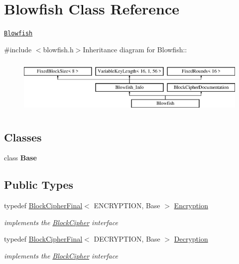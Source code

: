 \hypertarget{class_blowfish}{
\section{Blowfish Class Reference}
\label{class_blowfish}
}


\href{http://www.weidai.com/scan-mirror/cs.html#Blowfish}{\tt Blowfish}  


{\ttfamily \#include $<$blowfish.h$>$}Inheritance diagram for Blowfish::\begin{figure}[H]
\begin{center}
\leavevmode
\includegraphics[height=2.73171cm]{class_blowfish}
\end{center}
\end{figure}
\subsection*{Classes}
\begin{DoxyCompactItemize}
\item 
class {\bfseries Base}
\end{DoxyCompactItemize}
\subsection*{Public Types}
\begin{DoxyCompactItemize}
\item 
\hypertarget{class_blowfish_a0be3672f335ece25211763751da484d5}{
typedef \hyperlink{class_block_cipher_final}{BlockCipherFinal}$<$ ENCRYPTION, Base $>$ \hyperlink{class_blowfish_a0be3672f335ece25211763751da484d5}{Encryption}}
\label{class_blowfish_a0be3672f335ece25211763751da484d5}

\begin{DoxyCompactList}\small\item\em implements the \hyperlink{class_block_cipher}{BlockCipher} interface \item\end{DoxyCompactList}\item 
\hypertarget{class_blowfish_ab1ffd7ac4dd3927a06f92a92877e43b1}{
typedef \hyperlink{class_block_cipher_final}{BlockCipherFinal}$<$ DECRYPTION, Base $>$ \hyperlink{class_blowfish_ab1ffd7ac4dd3927a06f92a92877e43b1}{Decryption}}
\label{class_blowfish_ab1ffd7ac4dd3927a06f92a92877e43b1}

\begin{DoxyCompactList}\small\item\em implements the \hyperlink{class_block_cipher}{BlockCipher} interface \item\end{DoxyCompactList}\end{DoxyCompactItemize}


